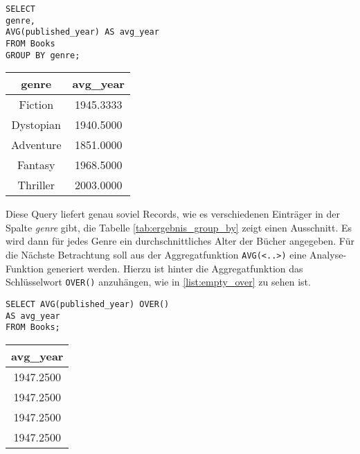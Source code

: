 \begin{minipage}{0.55\textwidth}
	 \begin{lstlisting}
SELECT
genre,
AVG(published_year) AS avg_year
FROM Books
GROUP BY genre;
	\end{lstlisting}
\end{minipage}
\hfill
\begin{minipage}{0.45\textwidth}
	\centering
	\begin{tabular}{|c|c|}
		\hline
		\textbf{genre} & \textbf{avg\_year} \\
		\hline
		Fiction        & 1945.3333          \\
		\hline
		Dystopian      & 1940.5000          \\
		\hline
		Adventure      & 1851.0000          \\
		\hline
		Fantasy        & 1968.5000          \\
		\hline
		Thriller       & 2003.0000          \\
		\hline
	\end{tabular}
	 \label{tab:ergebnis_group_by}
\end{minipage}

Diese Query liefert genau soviel Records, wie es verschiedenen Einträger in der
Spalte \textit{genre} gibt, die Tabelle \ref{tab:ergebnis_group_by} zeigt einen
Ausschnitt. Es wird dann für jedes Genre ein durchschnittliches Alter der Bücher
angegeben. Für die Nächste Betrachtung soll aus der Aggregatfunktion \texttt{AVG(<..>)}
eine Analyse-Funktion generiert werden. Hierzu ist hinter die Aggregatfunktion
das Schlüsselwort \texttt{OVER()} anzuhängen, wie in \ref{list:empty_over} zu
sehen ist.

\begin{minipage}{0.60\textwidth}
	 \begin{lstlisting}
SELECT AVG(published_year) OVER()
AS avg_year
FROM Books;
	\end{lstlisting}
\end{minipage}
\hfill
\begin{minipage}{0.45\textwidth}
	\centering
	\begin{tabular}{|c|}
		\hline
		\textbf{avg\_year} \\
		\hline
		1947.2500          \\
		\hline
		1947.2500          \\
		\hline
		1947.2500          \\
		\hline
		1947.2500          \\
		\hline
	\end{tabular}
	 \label{tab:ergebnis_over}
\end{minipage}

